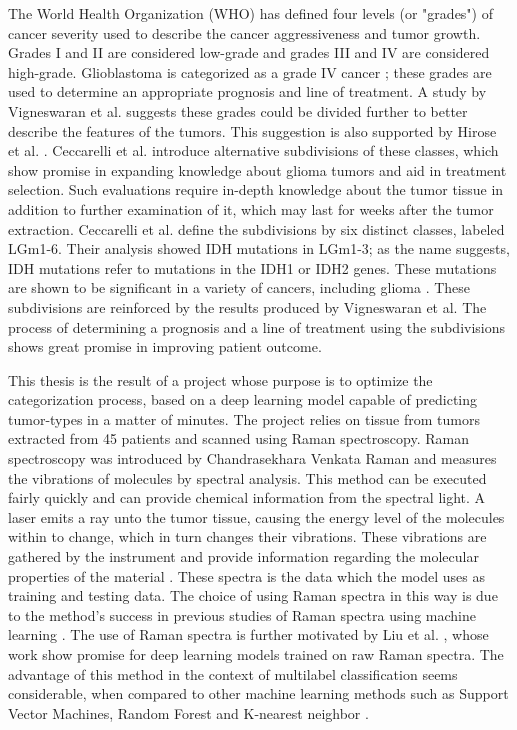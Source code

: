 The World Health Organization (WHO) has defined four levels (or "grades") of cancer severity used to describe the cancer aggressiveness and tumor growth. Grades I and II are considered low-grade and grades III and IV are considered high-grade. Glioblastoma is categorized as a grade IV cancer \cite{bleeker2012recent, gradesandpriorsubdivision}; these grades are used to determine an appropriate prognosis and line of treatment. A study by Vigneswaran et al. \cite{gradesandpriorsubdivision} suggests these grades could be divided further to better describe the features of the tumors. This suggestion is also supported by Hirose et al. \cite{hirose2013subgrouping}. Ceccarelli et al. \cite{cellsubsets} introduce alternative subdivisions of these classes, which show promise in expanding knowledge about glioma tumors and aid in treatment selection. Such evaluations require in-depth knowledge about the tumor tissue in addition to further examination of it, which may last for weeks after the tumor extraction. Ceccarelli et al. define the subdivisions by six distinct classes, labeled LGm1-6. Their analysis showed IDH mutations in LGm1-3; as the name suggests, IDH mutations refer to mutations in the IDH1 or IDH2 genes. These mutations are shown to be significant in a variety of cancers, including glioma \cite{dang2016idh}. %
These subdivisions are reinforced by the results produced by Vigneswaran et al. The process of determining a prognosis and a line of treatment using the subdivisions shows great promise in improving patient outcome.

This thesis is the result of a project whose purpose is to optimize the categorization process, based on a deep learning model capable of predicting tumor-types in a matter of minutes. The project relies on tissue from tumors extracted from 45 patients and scanned using Raman spectroscopy. Raman spectroscopy was introduced by Chandrasekhara Venkata Raman and measures the vibrations of molecules by spectral analysis. This method can be executed fairly quickly and can provide chemical information from the spectral light. A laser emits a ray unto the tumor tissue, causing the energy level of the molecules within to change, which in turn changes their vibrations. These vibrations are gathered by the instrument and provide information regarding the molecular properties of the material \cite{long1977raman, graves1989practical}. These spectra is the data which the model uses as training and testing data. The choice of using Raman spectra in this way is due to the method's success in previous studies of Raman spectra using machine learning \cite{ramanDL, ho2019rapid}. The use of Raman spectra is further motivated by Liu et al. \cite{liu2017deep}, whose work show promise for deep learning models trained on raw Raman spectra. The advantage of this method in the context of multilabel classification seems considerable, when compared to other machine learning methods such as Support Vector Machines, Random Forest and K-nearest neighbor \cite{liu2017deep}.

